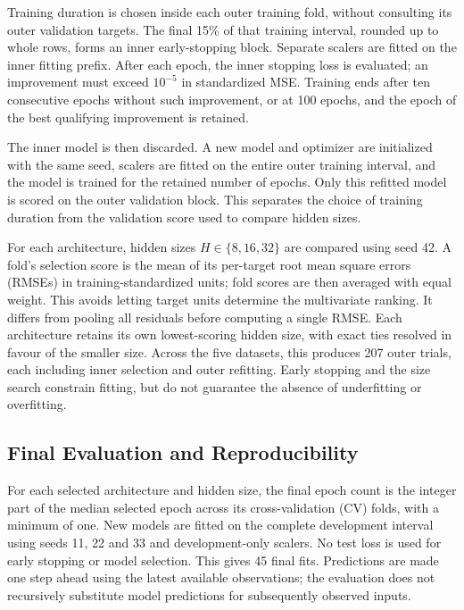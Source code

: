 Training duration is chosen inside each outer training fold, without consulting
its outer validation targets. The final 15\% of that training interval, rounded
up to whole rows, forms an inner early-stopping block. Separate scalers are
fitted on the inner fitting prefix. After each epoch, the inner stopping loss is
evaluated; an improvement must exceed $10^{-5}$ in standardized MSE. Training
ends after ten consecutive epochs without such improvement, or at 100 epochs,
and the epoch of the best qualifying improvement is retained.

The inner model is then discarded. A new model and optimizer are initialized
with the same seed, scalers are fitted on the entire outer training interval,
and the model is trained for the retained number of epochs. Only this refitted
model is scored on the outer validation block. This separates the choice of
training duration from the validation score used to compare hidden sizes.

For each architecture, hidden sizes $H\in\{8,16,32\}$ are compared using seed
42. A fold's selection score is the mean of its per-target root mean square
errors (RMSEs) in
training-standardized units; fold scores are then averaged with equal weight.
This avoids letting target units determine the multivariate ranking. It differs
from pooling all residuals before computing a single RMSE. Each architecture
retains its own lowest-scoring hidden size, with exact ties resolved in favour
of the smaller size. Across the five datasets, this produces 207 outer trials,
each including inner selection and outer refitting. Early stopping and the size
search constrain fitting, but do not guarantee the absence of underfitting or
overfitting.

\subsection{Final Evaluation and Reproducibility}
For each selected architecture and hidden size, the final epoch count is the
integer part of the median selected epoch across its cross-validation (CV)
folds, with a minimum of
one. New models are fitted on the complete development interval using seeds 11,
22 and 33 and development-only scalers. No test loss is used for early stopping
or model selection. This gives 45 final fits. Predictions are made one step
ahead using the latest available observations; the evaluation does not
recursively substitute model predictions for subsequently observed inputs.

